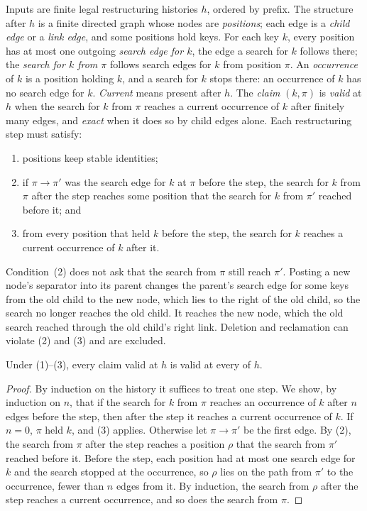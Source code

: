 Inputs are finite legal restructuring histories $h$, ordered by prefix.  The
structure after $h$ is a finite directed graph whose nodes are
\emph{positions}; each edge is a \emph{child edge} or a \emph{link edge}, and
some positions hold keys.  For each key $k$, every position has at most one
outgoing \emph{search edge for $k$}, the edge a search for $k$ follows there;
the \emph{search for $k$ from $\pi$} follows search edges for $k$ from position
$\pi$.  An \emph{occurrence} of $k$ is a position holding $k$, and a search
for $k$ stops there: an occurrence of $k$ has no search edge for $k$.
\emph{Current} means present after $h$.  The \emph{claim} $(k,\pi)$ is
\emph{valid} at $h$ when the search for $k$ from $\pi$ reaches a current
occurrence of $k$ after finitely many edges, and \emph{exact} when it does so
by child edges alone.  Each restructuring step must satisfy:
\begin{enumerate}
  \item positions keep stable identities;
  \item if $\pi\to\pi'$ was the search edge for $k$ at $\pi$ before the step,
        the search for $k$ from $\pi$ after the step reaches some position
        that the search for $k$ from $\pi'$ reached before it; and
  \item from every position that held $k$ before the step, the search for $k$
        reaches a current occurrence of $k$ after it.
\end{enumerate}
Condition~(2) does not ask that the search from $\pi$ still reach $\pi'$.
Posting a new node's separator into its parent changes the parent's search
edge for some keys from the old child to the new node, which lies to the
right of the old child, so the search no longer reaches the old child.  It
reaches the new node, which the old search reached through the old child's
right link.  Deletion and reclamation can violate (2) and (3) and are
excluded.

\begin{proposition}
\label{prop:persistent-forwarding}
Under (1)--(3), every claim valid at $h$ is valid at every \indesc of $h$.
\end{proposition}

\begin{proof}
By induction on the history it suffices to treat one step.  We show, by
induction on $n$, that if the search for $k$ from $\pi$ reaches an occurrence
of $k$ after $n$ edges before the step, then after the step it reaches a
current occurrence of $k$.  If $n=0$, $\pi$ held $k$, and (3) applies.
Otherwise let $\pi\to\pi'$ be the first edge.  By (2), the search from $\pi$
after the step reaches a position $\rho$ that the search from $\pi'$ reached
before it.  Before the step, each position had at most one search edge for $k$
and the search stopped at the occurrence, so $\rho$ lies on the path from
$\pi'$ to the occurrence, fewer than $n$ edges from it.  By induction, the
search from $\rho$ after the step reaches a current occurrence, and so does the
search from $\pi$.
\end{proof}

